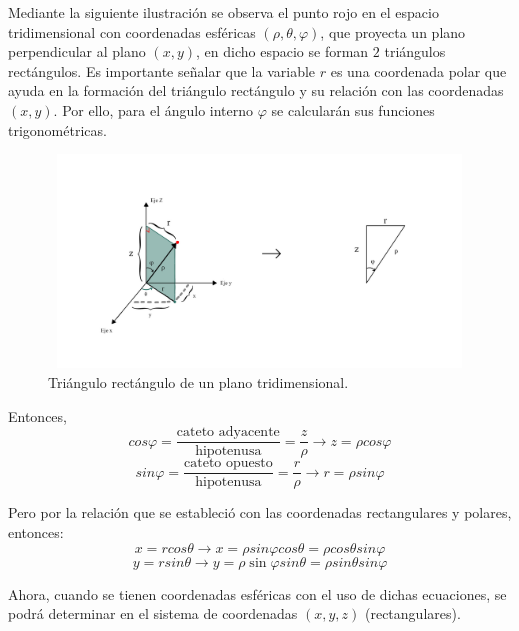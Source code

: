 Mediante la siguiente ilustración se observa el punto rojo en el espacio tridimensional con coordenadas esféricas $(\rho,\theta,\varphi)$, que proyecta un plano perpendicular al plano $(x,y)$, en dicho espacio se forman $2$ triángulos rectángulos. Es importante señalar que la variable $r$ es una coordenada polar que ayuda en la formación del triángulo rectángulo y su relación con las coordenadas $(x,y)$. Por ello, para el ángulo interno $\varphi$ se calcularán sus funciones trigonométricas.

\begin{figure}[H]
  \centering
  \includegraphics[width=11.17cm, height=5.67cm]{img/graph/coord_esf_2_rect_1.jpg}
  \caption{Triángulo rectángulo de un plano tridimensional.}
  \label{relacion_de_coordenadas}
\end{figure}

Entonces,
\[cos \varphi = \frac{\text{cateto adyacente}}{\text{hipotenusa}} = \frac{z}{\rho} \rightarrow z = \rho cos \varphi\]
\[sin \varphi = \frac{\text{cateto opuesto}}{\text{hipotenusa}} = \frac{r}{\rho} \rightarrow r = \rho sin \varphi\]

\vspace{4mm}
Pero por la relación que se estableció con las coordenadas rectangulares y polares, entonces:
\[x = r cos \theta \rightarrow x = \rho sin \varphi cos \theta = \rho cos \theta sin \varphi\]
\[y = r sin \theta \rightarrow y = \rho \sin \varphi sin \theta = \rho sin \theta sin \varphi\]

\vspace{4mm}
Ahora, cuando se tienen coordenadas esféricas con el uso de dichas ecuaciones, se podrá determinar en el sistema de coordenadas $(x,y,z)$ (rectangulares).
